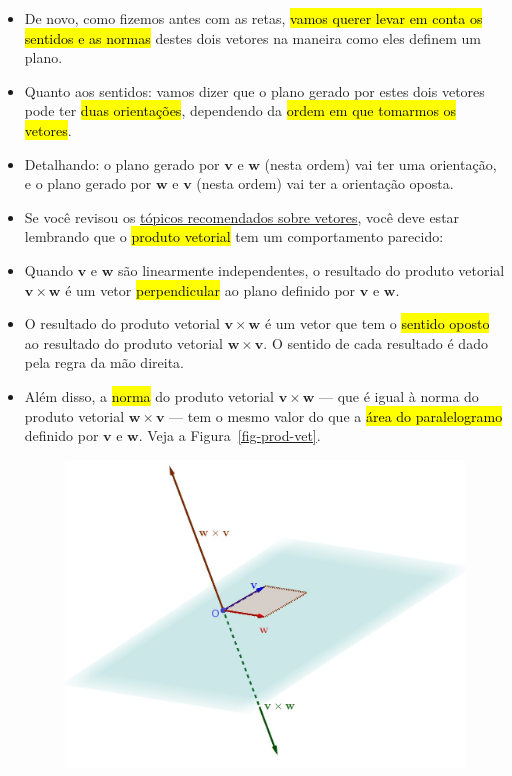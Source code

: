\documentclass[
  letterpaper,
  DIV=11,
  numbers=noendperiod]{scrreprt}
\begin{document}
\begin{itemize}
\begin{figure}[t]
  \end{figure}
\item
  De novo, como fizemos antes com as retas, {\hl{vamos querer levar em
  conta os sentidos e as normas}} destes dois vetores na maneira como
  eles definem um plano.
\item
  Quanto aos sentidos: vamos dizer que o plano gerado por estes dois
  vetores pode ter {\hl{duas orientações}}, dependendo da {\hl{ordem em
  que tomarmos os vetores}}.
\item
  Detalhando: o plano gerado por $\mathbf{v}$ e $\mathbf{w}$ (nesta
  ordem) vai ter uma orientação, e o plano gerado por $\mathbf{w}$ e
  $\mathbf{v}$ (nesta ordem) vai ter a orientação oposta.
\item
  Se você revisou os \protect\hyperlink{topicos-vetores}{tópicos
  recomendados sobre vetores}, você deve estar lembrando que o
  {\hl{produto vetorial}} tem um comportamento parecido:
\item
  Quando $\mathbf{v}$ e $\mathbf{w}$ são linearmente independentes, o
  resultado do produto vetorial $\mathbf{v} \times \mathbf{w}$ é um
  vetor {\hl{perpendicular}} ao plano definido por $\mathbf{v}$ e
  $\mathbf{w}$.
\item
  O resultado do produto vetorial $\mathbf{v} \times \mathbf{w}$ é um
  vetor que tem o {\hl{sentido oposto}} ao resultado do produto vetorial
  $\mathbf{w} \times \mathbf{v}$. O sentido de cada resultado é dado
  pela regra da mão direita.
\item
  Além disso, a {\hl{norma}} do produto vetorial
  $\mathbf{v} \times \mathbf{w}$ --- que é igual à norma do produto
  vetorial $\mathbf{w} \times \mathbf{v}$ --- tem o mesmo valor do que a
  {\hl{área do paralelogramo}} definido por $\mathbf{v}$ e $\mathbf{w}$.
  Veja a Figura~\ref{fig-prod-vet}.

  \begin{figure}[t]

  {\centering \includegraphics[width=1\textwidth,height=\textheight]{figures/prod-vet.jpg}

}
\end{figure}
\end{itemize}
\end{document}
